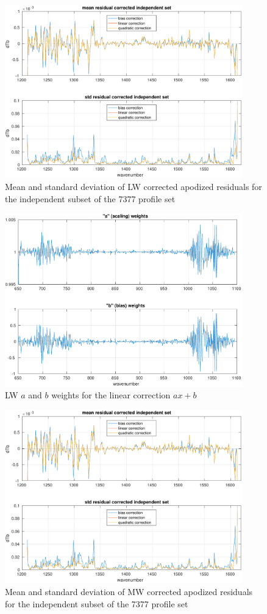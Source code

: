 \documentclass[11pt]{article}
\begin{document}
\begin{figure} %
  \centering
  \includegraphics[height=7.5cm]{figures/a2cris_stat_LW.pdf}
  \caption{Mean and standard deviation of LW corrected apodized
    residuals for the independent subset of the 7377 profile set}
  \label{statLW}
\end{figure}

\begin{figure} %
  \centering
  \includegraphics[height=7.5cm]{figures/a2cris_coef_LW.pdf}
  \caption{LW $a$ and $b$ weights for the linear correction $ax+b$}
  \label{coefLW}
\end{figure}

\begin{figure} %
  \centering
  \includegraphics[height=7.5cm]{figures/a2cris_stat_MW.pdf}
  \caption{Mean and standard deviation of MW corrected apodized
    residuals for the independent subset of the 7377 profile set}
  \label{statMW}
\end{figure}
\end{document}
